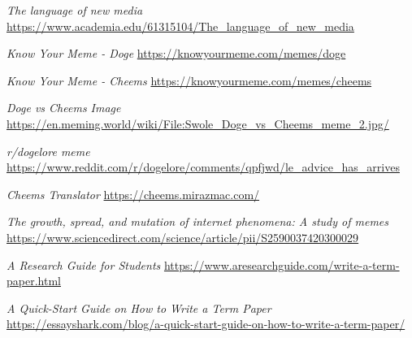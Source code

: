 \def\DevnagVersion{2.17}\documentclass{article}
\begin{document}
\begin{thebibliography}{}
    \emph{The language of new media} \url{https://www.academia.edu/61315104/The_language_of_new_media}

    \emph{Know Your Meme - Doge} \url{https://knowyourmeme.com/memes/doge}

    \emph{Know Your Meme - Cheems} \url{https://knowyourmeme.com/memes/cheems}

    \emph{Doge vs Cheems Image} \url{https://en.meming.world/wiki/File:Swole_Doge_vs_Cheems_meme_2.jpg/}

    \emph{r/dogelore meme} \url{https://www.reddit.com/r/dogelore/comments/qpfjwd/le_advice_has_arrives}

    \emph{Cheems Translator} \url{https://cheems.mirazmac.com/}

    \emph{The growth, spread, and mutation of internet phenomena: A study of memes} \url{https://www.sciencedirect.com/science/article/pii/S2590037420300029}

    \emph{A Research Guide for Students} \url{https://www.aresearchguide.com/write-a-term-paper.html}

    \emph{A Quick-Start Guide on How to Write a Term Paper} \url{https://essayshark.com/blog/a-quick-start-guide-on-how-to-write-a-term-paper/}
\end{thebibliography}
\end{document}
